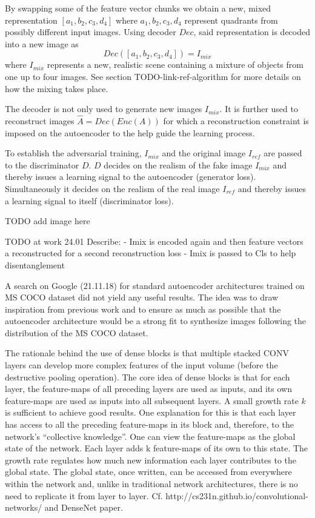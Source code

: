 \documentclass[11pt,a4paper]{article}
\begin{document}
By swapping some of the feature vector chunks we obtain a new, mixed representation $[a_1, b_2, c_3, d_4]$ where $a_1,b_2,c_3,d_4$ represent quadrants from possibly different input images. Using decoder $Dec$, said representation is decoded into a new image as
\begin{equation} \label{eq:3}
    Dec([a_1, b_2, c_3, d_4]) = I_{mix}
\end{equation}
where $I_{mix}$ represents a new, realistic scene containing a mixture of objects from one up to four images. See section TODO-link-ref-algorithm for more details on how the mixing takes place.

The decoder is not only used to generate new images $I_{mix}$. It is further used to reconstruct images $\hat{A} = Dec(Enc(A))$ for which a reconstruction constraint is imposed on the autoencoder to the help guide the learning process.

To establish the adversarial training, $I_{mix}$ and the original image $I_{ref}$ are passed to the discriminator $D$. $D$ decides on the realism of the fake image $I_{mix}$ and thereby issues a learning signal to the autoencoder (generator loss). Simultaneously it decides on the realism of the real image $I_{ref}$ and thereby issues a learning signal to itself (discriminator loss).

TODO add image here

TODO at work 24.01
Describe:
- Imix is encoded again and then feature vectors a reconstructed for a second reconstruction loss
- Imix is passed to Cls to help disentanglement





\par A search on Google (21.11.18) for standard autoencoder architectures trained on MS COCO dataset did not yield any useful results. The idea was to draw inspiration from previous work and to ensure as much as possible that the autoencoder architecture would be a strong fit to synthesize images following the distribution of the MS COCO dataset.

\par The rationale behind the use of dense blocks is that multiple stacked CONV layers can develop more complex features of the input volume (before the destructive pooling operation). The core idea of dense blocks is that for each layer, the feature-maps of all preceding layers are used as inputs, and its own feature-maps are used as inputs into all subsequent layers. A small growth rate $k$ is sufficient to achieve good results. One explanation for this is that each layer has access to all the preceding feature-maps in its block and, therefore, to the network’s “collective knowledge”. One can view the feature-maps as the global state of the network. Each layer adds k feature-maps of its own to this state. The growth
rate regulates how much new information each layer contributes to the global state. The global state, once written, can be accessed from everywhere within the network and, unlike in traditional network architectures, there is no need to replicate it from layer to layer.
Cf. http://cs231n.github.io/convolutional-networks/ and DenseNet paper.
\end{document}
